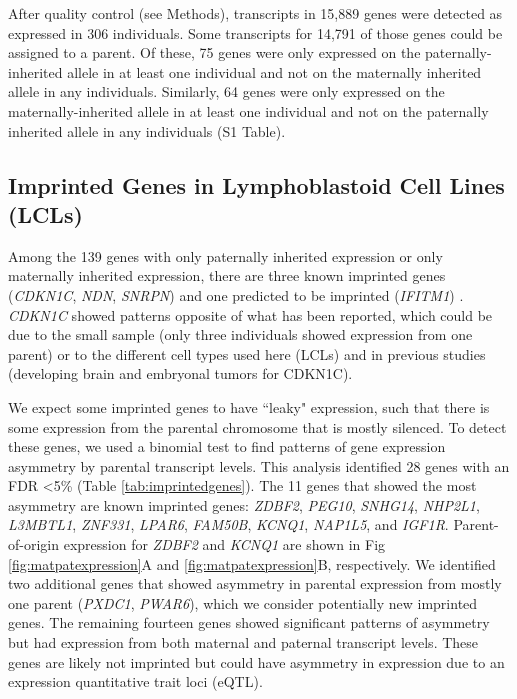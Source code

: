 After quality control (see Methods), transcripts in 15,889 genes were detected as expressed in 306 individuals. Some transcripts for 14,791 of those genes could be assigned to a parent. Of these, 75 genes were only expressed on the paternally-inherited allele in at least one individual and not on the maternally inherited allele in any individuals. Similarly, 64 genes were only expressed on the maternally-inherited allele in at least one individual and not on the paternally inherited allele in any individuals (S1 Table).

\subsection{Imprinted Genes in Lymphoblastoid Cell Lines (LCLs)}\label{Imprinted Genes in Lymphoblastoid Cell Lines (LCLs)}
Among the 139 genes with only paternally inherited expression or only maternally inherited expression, there are three known imprinted genes (\emph{CDKN1C}, \emph{NDN}, \emph{SNRPN}) and one predicted to be imprinted (\emph{IFITM1}) \cite{Luedi:2007ib}. \emph{CDKN1C} showed patterns opposite of what has been reported\cite{Hatada:1995jf,Matsuoka:1996uq}, which could be due to the small sample (only three individuals showed expression from one parent) or to the different cell types used here (LCLs) and in previous studies (developing brain and embryonal tumors for CDKN1C).

We expect some imprinted genes to have ``leaky" expression, such that there is some expression from the parental chromosome that is mostly silenced. To detect these genes, we used a binomial test to find patterns of gene expression asymmetry by parental transcript levels.  This analysis identified 28 genes with an FDR \textless5\% (Table \ref{tab:imprintedgenes}). The 11 genes that showed the most asymmetry are known imprinted genes: \emph{ZDBF2}, \emph{PEG10}, \emph{SNHG14}, \emph{NHP2L1}, \emph{L3MBTL1}, \emph{ZNF331}, \emph{LPAR6}, \emph{FAM50B}, \emph{KCNQ1}, \emph{NAP1L5}, and \emph{IGF1R}. Parent-of-origin expression for \emph{ZDBF2} and \emph{KCNQ1} are shown in Fig \ref{fig:matpatexpression}A and \ref{fig:matpatexpression}B, respectively. We identified two additional genes that showed asymmetry in parental expression from mostly one parent (\emph{PXDC1}, \emph{PWAR6}), which we consider potentially new imprinted genes. The remaining fourteen genes showed significant patterns of asymmetry but had expression from both maternal and paternal transcript levels. These genes are likely not imprinted but could have asymmetry in expression due to an expression quantitative trait loci (eQTL). 




